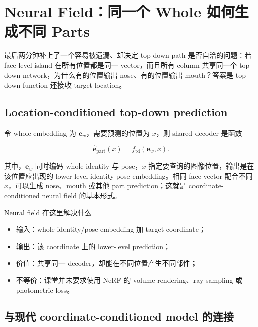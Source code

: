 \section{Neural Field：同一个 Whole 如何生成不同 Parts}

最后两分钟补上了一个容易被遗漏、却决定 top-down path 是否自洽的问题：若 face-level island 在所有位置都是同一 vector，而且所有 column 共享同一个 top-down network，为什么有的位置输出 nose、有的位置输出 mouth？答案是 top-down function 还接收 target location。

\subsection{Location-conditioned top-down prediction}

令 whole embedding 为 $\mathbf e_w$，需要预测的位置为 $x$，则 shared decoder 是函数

\[
\hat{\mathbf e}_{\mathrm{part}}(x)=f_{\mathrm{td}}\!\left(\mathbf e_w,x\right).
\]

其中，$\mathbf e_w$ 同时编码 whole identity 与 pose，$x$ 指定要查询的图像位置，输出是在该位置应出现的 lower-level identity-pose embedding。相同 face vector 配合不同 $x$，可以生成 nose、mouth 或其他 part prediction；这就是 coordinate-conditioned neural field 的基本形式。


\begin{knowledgebox}{Neural field 在这里解决什么}
\begin{itemize}
  \item 输入：whole identity/pose embedding 加 target coordinate；
  \item 输出：该 coordinate 上的 lower-level prediction；
  \item 价值：共享同一 decoder，却能在不同位置产生不同部件；
  \item 不等价：课堂并未要求使用 NeRF 的 volume rendering、ray sampling 或 photometric loss。
\end{itemize}
\end{knowledgebox}

\subsection{与现代 coordinate-conditioned model 的连接}

